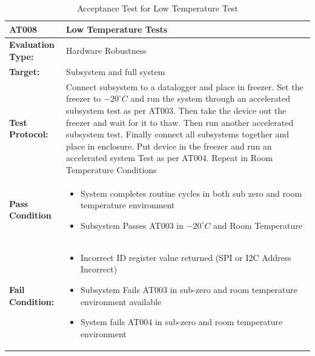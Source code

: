 \begin{table}[H]
    \centering
    \caption{Acceptance Test for Low Temperature Test}
    \begin{tabular}{|m{}|m{}|}
    \hline
   \textbf{AT008 }& \textbf{Low Temperature Tests} \\
     \hline
    \textbf{Evaluation Type:} & Hardware Robustness\\
     \hline
    \textbf{Target: } & Subsystem and full system \\
    \hline
    \textbf{Test Protocol:} & Connect subsystem to a datalogger and place in freezer. Set the freezer to $-20^\circ C$ and run the system through an accelerated subsystem test as per AT003. Then take the device out the freezer and wait for it to thaw. Then run another accelerated subsystem test. Finally connect all subsystems together and place in enclosure. Put device in the freezer and run an accelerated system Test as per AT004. Repeat in Room Temperature Conditions\\
    \hline
    \textbf{Pass Condition} & \vspace{5pt} \begin{itemize}
        \item System completes routine cycles in both sub zero and room temperature environment
        \item Subsystem Passes AT003 in $-20^\circ C$ and Room Temperature
    \end{itemize} \\
    \hline
    \textbf{Fail Condition:} & \vspace{5pt} \begin{itemize}
        \item Incorrect ID register value returned (SPI or I2C Address Incorrect)
        \item Subsystem Fails AT003 in sub-zero and room temperature environment available
        \item System fails AT004 in sub-zero and room temperature environment
        \end{itemize}\\
        \hline
    \end{tabular}
    \label{tab:AT008}
\end{table}

